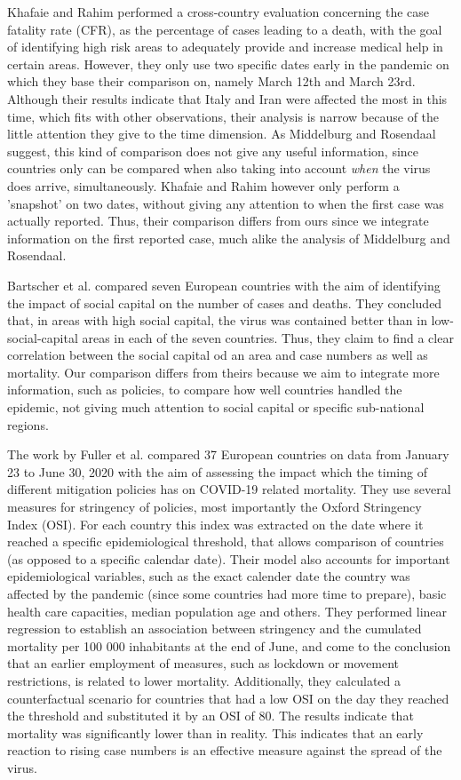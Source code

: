 \documentclass[a4paper,11pt]{article}
\begin{document}
Khafaie and Rahim \cite{khafaie2020cross} performed a cross-country evaluation concerning the case fatality rate (CFR), as the percentage of cases leading to a death, with the goal of identifying high risk areas to adequately provide and increase medical help in certain areas.
However, they only use two specific dates early in the pandemic on which they base their comparison on, namely March 12th and
March 23rd. Although their results indicate that Italy and Iran were affected the most in this time, which fits with other 
observations, their analysis is narrow because of the little attention they give to the time dimension.
As Middelburg and Rosendaal suggest, this kind of comparison does not give any useful information, since countries only
can be compared when also taking into account \textit{when} the virus does arrive, simultaneously. Khafaie and Rahim
however only perform a 'snapshot' on two dates, without giving any attention to when the first case was actually reported.
Thus, their comparison differs from ours since we integrate information on the first reported case, much alike the analysis of 
Middelburg and Rosendaal.

Bartscher et al. \cite{bartscher2020social} compared seven European countries with the aim of identifying the impact of social
capital on the number of cases and deaths. They concluded that, in areas with high social capital, the virus was contained better
than in low-social-capital areas in each of the seven countries. Thus, they claim to find a clear correlation between the 
social capital od an area and case numbers as well as mortality. Our comparison differs from theirs because we aim to 
integrate more information, such as policies, to compare how well countries handled the epidemic, not giving much attention to
social capital or specific sub-national regions.

The work by Fuller et al. \cite{fuller2021mitigation} compared 37 European countries on data from January 23 to June 30, 2020 with the aim of assessing the impact which the timing of different mitigation policies has on COVID-19 related mortality. They use several 
measures for stringency of policies, most importantly the Oxford Stringency Index (OSI). For each country this index was extracted on the date where it reached a specific epidemiological threshold, that allows comparison of countries (as opposed to a specific calendar
date). Their model also accounts for important epidemiological variables, such as the exact calender date the country was
affected by the pandemic (since some countries had more time to prepare), basic health care capacities, median population age and others.
They performed linear regression to establish an association between stringency and the cumulated mortality per 100 000
inhabitants at the end of June, and come to the conclusion that an earlier employment of measures, such as lockdown or movement restrictions, is related to lower mortality. Additionally, they calculated a counterfactual scenario for countries that had a 
low OSI on the day they reached the threshold and substituted it by an OSI of 80. The results indicate that mortality was significantly lower than in reality.
This indicates that an early reaction to rising case numbers is an effective measure against the spread of the virus.
\end{document}
